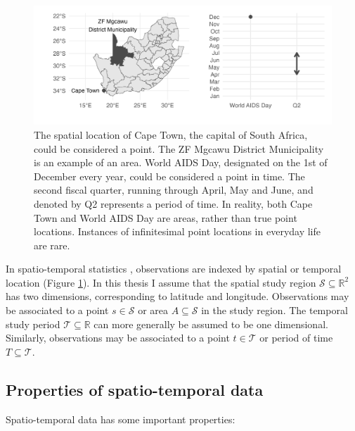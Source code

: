 \documentclass[a4paper, nobind]{templates/ociamthesis}
\begin{document}
\begin{figure}

{\centering \includegraphics[width=0.95\linewidth]{figures/bayesian/st} 

}

\caption{The spatial location of Cape Town, the capital of South Africa, could be considered a point. The ZF Mgcawu District Municipality is an example of an area. World AIDS Day, designated on the 1st of December every year, could be considered a point in time. The second fiscal quarter, running through April, May and June, and denoted by Q2 represents a period of time. In reality, both Cape Town and World AIDS Day are areas, rather than true point locations. Instances of infinitesimal point locations in everyday life are rare.}\label{fig:st}
\end{figure}

In spatio-temporal statistics \autocite{cressie2015statistics}, observations are indexed by spatial or temporal location (Figure \ref{fig:st}).
In this thesis I assume that the spatial study region \(\mathcal{S} \subseteq \mathbb{R}^2\) has two dimensions, corresponding to latitude and longitude.
Observations may be associated to a point \(s \in \mathcal{S}\) or area \(A \subseteq \mathcal{S}\) in the study region.
The temporal study period \(\mathcal{T} \subseteq \mathbb{R}\) can more generally be assumed to be one dimensional.
Similarly, observations may be associated to a point \(t \in \mathcal{T}\) or period of time \(T \subseteq \mathcal{T}\).

\hypertarget{properties-of-spatio-temporal-data}{%
\subsection{Properties of spatio-temporal data}\label{properties-of-spatio-temporal-data}}

Spatio-temporal data has some important properties:
\end{document}
